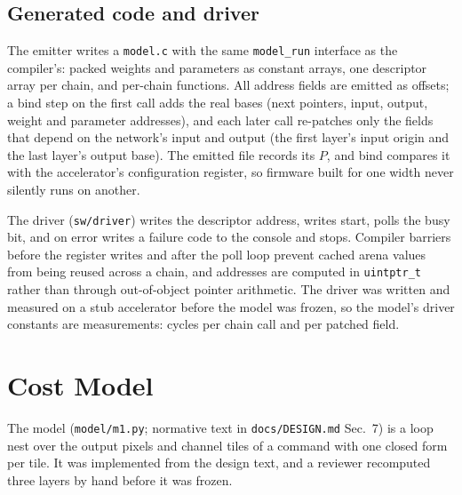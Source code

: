 \documentclass[journal]{IEEEtran}
\newcommand{\code}[1]{\texttt{#1}}
\begin{document}
\subsection{Generated code and driver}
The emitter writes a \texttt{model.c} with the same \texttt{model\_run} interface as the compiler's: packed weights and parameters as constant arrays, one descriptor array per chain, and per-chain functions. All address fields are emitted as offsets; a bind step on the first call adds the real bases (next pointers, input, output, weight and parameter addresses), and each later call re-patches only the fields that depend on the network's input and output (the first layer's input origin and the last layer's output base). The emitted file records its $P$, and bind compares it with the accelerator's configuration register, so firmware built for one width never silently runs on another.

The driver (\texttt{sw/driver}) writes the descriptor address, writes start, polls the busy bit, and on error writes a failure code to the console and stops. Compiler barriers before the register writes and after the poll loop prevent cached arena values from being reused across a chain, and addresses are computed in \code{uintptr\_t} rather than through out-of-object pointer arithmetic. The driver was written and measured on a stub accelerator before the model was frozen, so the model's driver constants are measurements: \DrvChain{} cycles per chain call and \DrvPatch{} per patched field.

\section{Cost Model}\label{sec:model}
The model (\texttt{model/m1.py}; normative text in \texttt{docs/DESIGN.md} Sec.~7) is a loop nest over the output pixels and channel tiles of a command with one closed form per tile. It was implemented from the design text, and a reviewer recomputed three layers by hand before it was frozen.
\end{document}
